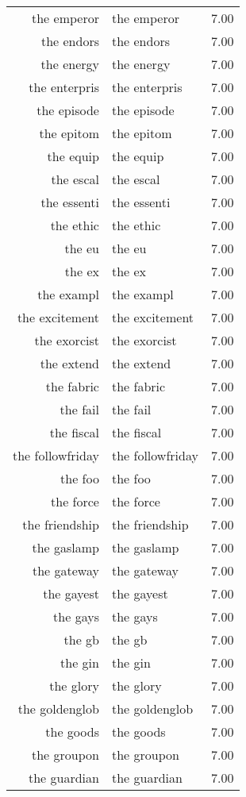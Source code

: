 \begin{table}[ht]
\begin{tabular}{rlr}
  the emperor & the emperor & 7.00 \\ 
  the endors & the endors & 7.00 \\ 
  the energy & the energy & 7.00 \\ 
  the enterpris & the enterpris & 7.00 \\ 
  the episode & the episode & 7.00 \\ 
  the epitom & the epitom & 7.00 \\ 
  the equip & the equip & 7.00 \\ 
  the escal & the escal & 7.00 \\ 
  the essenti & the essenti & 7.00 \\ 
  the ethic & the ethic & 7.00 \\ 
  the eu & the eu & 7.00 \\ 
  the ex & the ex & 7.00 \\ 
  the exampl & the exampl & 7.00 \\ 
  the excitement & the excitement & 7.00 \\ 
  the exorcist & the exorcist & 7.00 \\ 
  the extend & the extend & 7.00 \\ 
  the fabric & the fabric & 7.00 \\ 
  the fail & the fail & 7.00 \\ 
  the fiscal & the fiscal & 7.00 \\ 
  the followfriday & the followfriday & 7.00 \\ 
  the foo & the foo & 7.00 \\ 
  the force & the force & 7.00 \\ 
  the friendship & the friendship & 7.00 \\ 
  the gaslamp & the gaslamp & 7.00 \\ 
  the gateway & the gateway & 7.00 \\ 
  the gayest & the gayest & 7.00 \\ 
  the gays & the gays & 7.00 \\ 
  the gb & the gb & 7.00 \\ 
  the gin & the gin & 7.00 \\ 
  the glory & the glory & 7.00 \\ 
  the goldenglob & the goldenglob & 7.00 \\ 
  the goods & the goods & 7.00 \\ 
  the groupon & the groupon & 7.00 \\ 
  the guardian & the guardian & 7.00 \\ 

\end{tabular}
\end{table}
